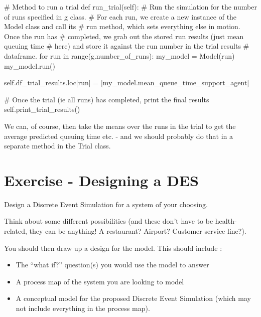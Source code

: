 \documentclass[
  letterpaper,
  DIV=11,
  numbers=noendperiod]{scrreprt}
\newenvironment{Shaded}{\begin{snugshade}}{\end{snugshade}}
\newcommand{\BuiltInTok}[1]{\textcolor[rgb]{0.00,0.23,0.31}{#1}}
\newcommand{\CommentTok}[1]{\textcolor[rgb]{0.37,0.37,0.37}{#1}}
\newcommand{\ControlFlowTok}[1]{\textcolor[rgb]{0.00,0.23,0.31}{#1}}
\newcommand{\KeywordTok}[1]{\textcolor[rgb]{0.00,0.23,0.31}{#1}}
\newcommand{\NormalTok}[1]{\textcolor[rgb]{0.00,0.23,0.31}{#1}}
\newcommand{\OperatorTok}[1]{\textcolor[rgb]{0.37,0.37,0.37}{#1}}
\newcommand{\VariableTok}[1]{\textcolor[rgb]{0.07,0.07,0.07}{#1}}
\providecommand{\tightlist}{%
  \setlength{\itemsep}{0pt}\setlength{\parskip}{0pt}}\usepackage{longtable,booktabs,array}
\begin{document}
\begin{tcolorbox}
\begin{Shaded}
\begin{Highlighting}[]
    \CommentTok{\# Method to run a trial}
    \KeywordTok{def}\NormalTok{ run\_trial(}\VariableTok{self}\NormalTok{):}
        \CommentTok{\# Run the simulation for the number of runs specified in g class.}
        \CommentTok{\# For each run, we create a new instance of the Model class and call its}
        \CommentTok{\# run method, which sets everything else in motion.  Once the run has}
        \CommentTok{\# completed, we grab out the stored run results (just mean queuing time}
        \CommentTok{\# here) and store it against the run number in the trial results}
        \CommentTok{\# dataframe.}
        \ControlFlowTok{for}\NormalTok{ run }\KeywordTok{in} \BuiltInTok{range}\NormalTok{(g.number\_of\_runs):}
\NormalTok{            my\_model }\OperatorTok{=}\NormalTok{ Model(run)}
\NormalTok{            my\_model.run()}

            \VariableTok{self}\NormalTok{.df\_trial\_results.loc[run] }\OperatorTok{=}\NormalTok{ [my\_model.mean\_queue\_time\_support\_agent]}

        \CommentTok{\# Once the trial (ie all runs) has completed, print the final results}
        \VariableTok{self}\NormalTok{.print\_trial\_results()}
\end{Highlighting}
\end{Shaded}

\end{tcolorbox}

We can, of course, then take the means over the runs in the trial to get
the average predicted queuing time etc. - and we should probably do that
in a separate method in the Trial class.

\chapter{Exercise - Designing a DES}\label{exercise---designing-a-des}

Design a Discrete Event Simulation for a system of your choosing.

Think about some different possibilities (and these don't have to be
health-related, they can be anything! A restaurant? Airport? Customer
service line?).

You should then draw up a design for the model. This should include :

\begin{itemize}
\tightlist
\item
  The ``what if?'' question(s) you would use the model to answer
\item
  A process map of the system you are looking to model
\item
  A conceptual model for the proposed Discrete Event Simulation (which
  may not include everything in the process map).
\end{itemize}
\end{document}
